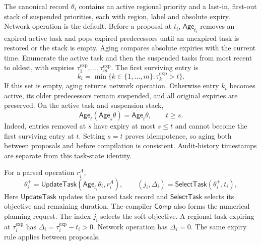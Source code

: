 \documentclass[preprint,12pt]{elsarticle}
\begin{document}
The canonical record $\theta_i$ contains an active regional priority and a
last-in, first-out stack of suspended priorities, each with region, label and
absolute expiry. Network operation is the default. Before a proposal at $t_i$,
$\mathsf{Age}_{t_i}$ removes an expired active task and pops expired predecessors until
an unexpired task is restored or the stack is empty. Aging compares absolute expiries with the current time. Enumerate the
active task and then the suspended tasks from most recent to oldest, with
expiries $\tau_1^{\mathrm{exp}},\ldots,\tau_m^{\mathrm{exp}}$. The first
surviving entry is
\begin{equation}
k_t=\min\{k\in\{1,\ldots,m\}:\tau_k^{\mathrm{exp}}>t\}.
\label{eq:task-age-survivor}
\end{equation}
If this set is empty, aging returns network operation. Otherwise entry
$k_t$ becomes active, its older predecessors remain suspended, and all
original expiries are preserved. On the active task and suspension stack,
\begin{equation}
\mathsf{Age}_t(\mathsf{Age}_s\theta)=\mathsf{Age}_t\theta,
\qquad t\ge s.
\label{eq:task-age-composition}
\end{equation}
Indeed, entries removed at $s$ have expiry at most $s\le t$ and cannot
become the first surviving entry at $t$. Setting $s=t$ proves idempotence,
so aging both between proposals and before compilation is consistent.
Audit-history timestamps are separate from this task-state identity.

For a parsed operation
$r_i^A$,
\begin{equation}
 \theta_i^+=\mathsf{UpdateTask}(\mathsf{Age}_{t_i}\theta_i,r_i^A),\qquad
 (j_i,\Delta_i)=\mathsf{SelectTask}(\theta_i^+,t_i),
 \label{eq:task-state-compiler}
\end{equation}
Here $\mathsf{UpdateTask}$ updates the parsed task record and
$\mathsf{SelectTask}$ selects its objective and remaining duration.
The compiler $\mathsf{Comp}$ also forms the numerical planning request.
The index $j_i$ selects the soft objective. A regional task expiring at $\tau_i^{\mathrm{exp}}$
has $\Delta_i=\tau_i^{\mathrm{exp}}-t_i>0$. Network operation has $\Delta_i=0$.
The same expiry rule applies between proposals.
\end{document}
